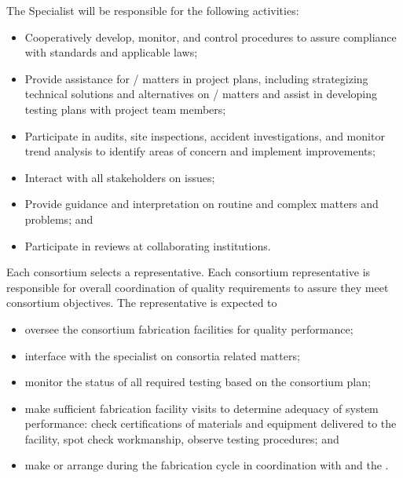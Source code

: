 The   Specialist will be responsible for the
following activities:
\begin{itemize}
	\item Cooperatively develop, monitor, and control 
           procedures to assure compliance with 
          standards and applicable laws;
     \item Provide assistance for / matters in project
       plans, including strategizing technical solutions and
       alternatives on / matters and assist in developing
       testing plans with project team members;
	   \item Participate in audits, site inspections, accident
             investigations, and monitor trend analysis to identify
             areas of concern and implement improvements;
	\item Interact with all stakeholders on  issues;
      \item Provide guidance and interpretation on routine and complex
         matters and problems; and
	\item Participate in reviews at collaborating institutions.
\end{itemize}

Each consortium selects a  representative. %
Each consortium  representative is responsible for
overall coordination of quality requirements to assure they meet
consortium objectives.  The  representative is expected to %
\begin{itemize}
  \item oversee the consortium fabrication facilities for quality
    performance;
  \item interface with the   specialist on
    consortia  related matters;
  \item monitor the status of all required testing based on the
    consortium  plan;
  \item make sufficient fabrication facility visits to determine
    adequacy of  system performance: check certifications
    of materials and equipment delivered to the facility, spot check
    workmanship, observe testing procedures; and
  \item make or arrange  during the fabrication cycle in
    coordination with  and the   .
\end{itemize}

